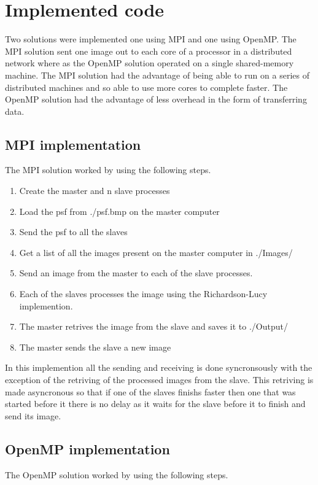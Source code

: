 \section{Implemented code}

Two solutions were implemented one using MPI and one using OpenMP. The MPI solution sent one image out to each core of a processor in a distributed network where as the OpenMP solution operated on a single shared-memory machine. The MPI solution had the advantage of being able to run on a series of distributed machines and so able to use more cores to complete faster. The OpenMP solution had the advantage of less overhead in the form of transferring data.

\subsection{MPI implementation}
The MPI solution worked by using the following steps.

\begin{enumerate}
	\item Create the master and n slave processes
	\item Load the psf from ./psf.bmp on the master computer
	\item Send the psf to all the slaves
	\item Get a list of all the images present on the master computer in ./Images/
	\item Send an image from the master to each of the slave processes.
	\item Each of the slaves processes the image using the Richardson-Lucy implemention.
	\item The master retrives the image from the slave and saves it to ./Output/
	\item The master sends the slave a new image
\end{enumerate}

In this implemention all the sending and receiving is done syncronsously with the exception of the retriving of the processed images from the slave. This retriving is made asyncronous so that if one of the slaves finishs faster then one that was started before it there is no delay as it waits for the slave before it to finish and send its image.

\subsection{OpenMP implementation}
The OpenMP solution worked by using the following steps.

